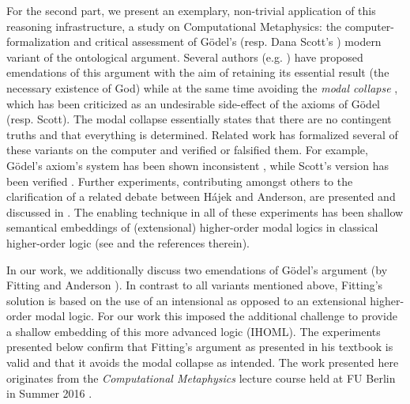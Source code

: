 \begin{isabellebody}
\begin{isamarkuptext}
\end{isamarkuptext}\isamarkuptrue%
%
\begin{isamarkuptext}%
For the second part, we present an exemplary, non-trivial application of this reasoning infrastructure,
a study on Computational Metaphysics: the computer-formalization and critical assessment
of G\"odel's \cite{GoedelNotes} (resp. Dana Scott's \cite{ScottNotes}) modern variant of the ontological argument.
Several authors (e.g. \cite{anderson90:_some_emend_of_goedel_ontol_proof,AndersonGettings,bjordal99,Hajek2002,Fitting}) 
have proposed emendations of this argument with the aim of retaining its essential result 
(the necessary existence of God) while at the same time avoiding the \emph{modal collapse} \cite{Sobel,sobel2004logic},
which has been criticized as an undesirable side-effect of the axioms of G\"odel (resp. Scott). The modal collapse essentially  
states that there are no contingent truths and that everything is determined.
Related work has formalized several of these variants on the computer and verified or falsified them. For example,
G\"odel's axiom's system has been shown inconsistent \cite{C55,C60},
while Scott's version has been verified \cite{ECAI}. Further experiments, contributing amongst others
to the clarification of a related debate between H\'ajek and Anderson, are presented and discussed in
\cite{J23}. The enabling technique in all of these experiments has been
shallow semantical embeddings of (extensional) higher-order modal logics in classical higher-order
logic (see \cite{J23,R59} and the references therein).%
\end{isamarkuptext}\isamarkuptrue%
%
\begin{isamarkuptext}%
In our work, we additionally discuss two emendations of G\"odel's argument (by Fitting \cite{Fitting} and
Anderson \cite{anderson90:_some_emend_of_goedel_ontol_proof}).
In contrast to all variants mentioned above, Fitting's solution is based on the use of an intensional as opposed
to an extensional higher-order modal logic. For our work this imposed the additional challenge to provide
a shallow embedding of this more advanced logic (IHOML). The experiments presented below confirm that Fitting's argument
as presented in his textbook \cite{Fitting} is valid and that it avoids the modal collapse as intended.
The work presented here originates from the \emph{Computational Metaphysics} lecture course held at
FU Berlin in Summer 2016 \cite{C65}.%
\end{isamarkuptext}\isamarkuptrue%
%
\end{isabellebody}
